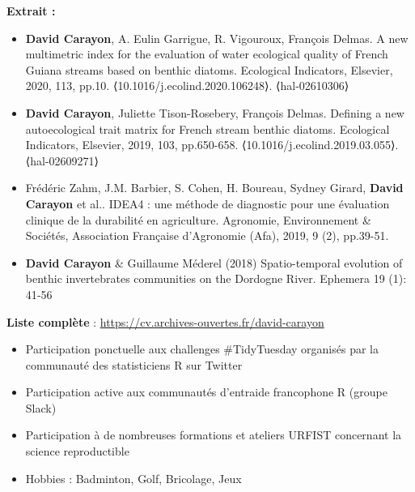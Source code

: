 \documentclass[localFont,alternative]{yaac-another-awesome-cv}
\begin{document}
\vspace{+1em}
\textbf{Extrait :}
\begin{itemize}

\item \textbf{David Carayon}, A. Eulin Garrigue, R. Vigouroux, François Delmas. A new multimetric index for the evaluation of water ecological quality of French Guiana streams based on benthic diatoms. Ecological Indicators, Elsevier, 2020, 113, pp.10. ⟨10.1016/j.ecolind.2020.106248⟩. ⟨hal-02610306⟩
\\
\item \textbf{David Carayon}, Juliette Tison-Rosebery, François Delmas. Defining a new autoecological trait matrix for French stream benthic diatoms. Ecological Indicators, Elsevier, 2019, 103, pp.650-658. ⟨10.1016/j.ecolind.2019.03.055⟩. ⟨hal-02609271⟩
\\
\item Frédéric Zahm, J.M. Barbier, S. Cohen, H. Boureau, Sydney Girard, \textbf{David Carayon} et al.. IDEA4 : une méthode de diagnostic pour une évaluation clinique de la durabilité en agriculture. Agronomie, Environnement \& Sociétés, Association Française d'Agronomie (Afa), 2019, 9 (2), pp.39-51.
\\
\item \textbf{David Carayon} \& Guillaume Méderel (2018) Spatio-temporal evolution of benthic invertebrates communities on the Dordogne River. Ephemera 19 (1): 41‑56

\end{itemize}

\Large
\textbf{Liste complète} : \href{https://cv.archives-ouvertes.fr/david-carayon}{\color{linkcolor} {https://cv.archives-ouvertes.fr/david-carayon}}

\vspace{+1em}

\normalsize


\begin{itemize}
\vspace{+1em}
\item Participation ponctuelle aux challenges \#TidyTuesday organisés par la communauté des statisticiens R sur Twitter\\
\item Participation active aux communautés d'entraide francophone R (groupe Slack) \\
\item Participation à de nombreuses formations et ateliers URFIST concernant la science reproductible\\
\item Hobbies : Badminton, Golf, Bricolage, Jeux

\end{itemize}
\end{document}
